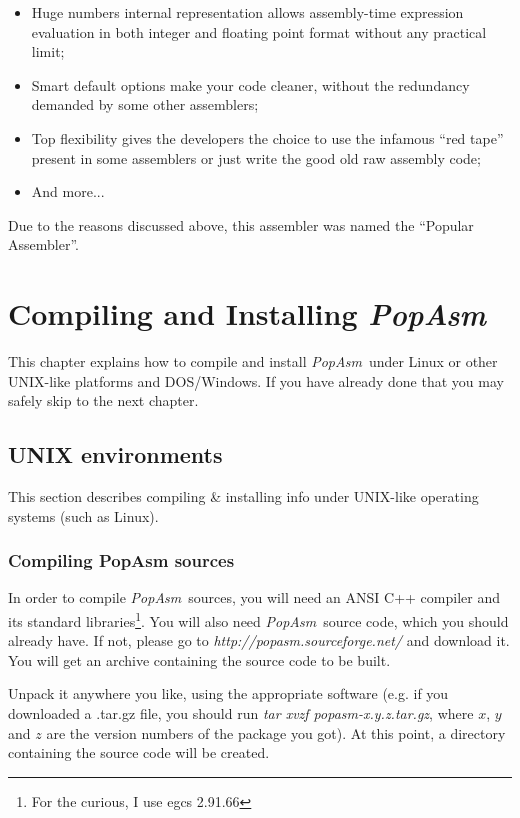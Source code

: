 \documentclass[a4paper,12pt]{book}
\newcommand{\popasm}{\emph{PopAsm}}
\begin{document}
\begin{itemize}
\item{Huge numbers internal representation} allows assembly-time
expression evaluation in both integer and floating
point format without any practical limit;
   \item{Smart default options} make your code cleaner, without the
redundancy demanded by some other assemblers;
\item{Top flexibility} gives the developers the choice to use the
infamous ``red tape'' present in some assemblers
or just write the good old raw assembly code;
\item{And more...}
\end{itemize}

Due to the reasons discussed above, this assembler was named the
``Popular Assembler''.

\chapter{Compiling and Installing \popasm}
This chapter explains how to compile and install \popasm\ under
Linux or other UNIX-like platforms and DOS/Windows. If you have
already done that you may safely skip to the next chapter.

\section{UNIX environments}

This section describes compiling \& installing info under UNIX-like
operating systems (such as Linux).

\subsection{Compiling PopAsm sources\label{COMPUNIX}}
In order to compile \popasm\ sources, you will need an ANSI C++
compiler and its standard libraries\footnote{For the curious, I
use egcs 2.91.66}. You will also need \popasm\ source code, which
you should already have. If not, please go to
\emph{http://popasm.sourceforge.net/} and download it. You will
get an archive containing the source code to be built.

Unpack it anywhere you like, using the appropriate software (e.g.
if you downloaded a .tar.gz file, you should run
\emph{tar xvzf popasm-x.y.z.tar.gz}, where $x$, $y$ and $z$ are
the version numbers of the package you got). At this point, a
directory containing the source code will be created.
\end{document}
